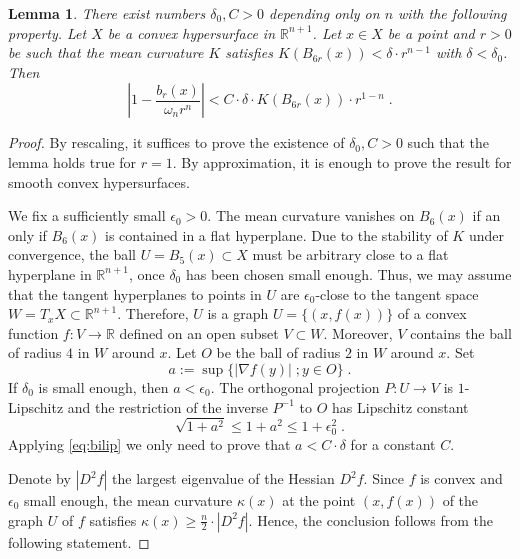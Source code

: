 \documentclass[12pt,leqno]{amsart}
\numberwithin{equation}{section}
\newtheorem{lem}[thm]{Lemma}
\theoremstyle{definition}
\theoremstyle{remark}
\newcommand{\R}{\mathbb{R}}
\begin{document}

\begin{lem}  \label{lem:mean}
There exist numbers $\delta_0,C>0$ depending only on $n$ with the following property. Let $X$ be a convex hypersurface in $\R^{n+1}$.
Let $x\in X$ be a point and $r>0$ be such that the mean curvature $K$ satisfies  $K(B_{6r} (x))  < \delta \cdot r^{n-1}$ with $\delta <\delta _0$.
Then
\begin{equation} \label{eq:lemma}
| 1 -  \frac {b_r (x)} { \omega _n r^n}| < C\cdot \delta \cdot K( B_{6r} (x)) \cdot r^{1-n} \; .
\end{equation}
\end{lem}


\begin{proof}
By rescaling, it suffices to prove the existence of $\delta _0, C>0$ such that the lemma holds true for $r=1$.
By approximation, it is enough to prove the result for smooth convex hypersurfaces.


We fix a sufficiently small $\epsilon _0>0$.   The mean curvature vanishes on $B_6 (x)$ if an only if $B_6(x)$ is contained in a flat hyperplane.
 Due to  the stability of $K$ under convergence,      the ball $U=B_{5} (x) \subset X$ must be  arbitrary close to a flat hyperplane in $\R^{n+1}$,
once $\delta _0$ has been chosen small enough.  Thus, we may assume
 that  the tangent hyperplanes  to points in $U$  are $\epsilon_0$-close to  the tangent
space  $W =T_xX \subset \R^{n+1}$.  Therefore, $U$ is a graph  $U=\{(x,f(x))\}$ of a convex function $f:V\to \R$ defined on an open subset $V\subset W$. Moreover, $V$ contains the ball of radius $4$ in $W$ around $x$. Let $O$
be the ball of radius $2$ in $W$ around $x$. Set
$$a :=\sup \{ |\nabla f (y)| \; ; y\in O \} \; .$$
If $\delta _0$ is small enough, then $a<\epsilon_0$.  The orthogonal projection $P:U\to V$ is $1$-Lipschitz and the restriction of the inverse $P^{-1}$ to $O$  has Lipschitz constant  $$\sqrt {1+ a^2}  \leq 1+a^2 \leq 1+\epsilon_0 ^2 \; .$$
Applying \eqref{eq:bilip} we only need to prove that $a < C \cdot \delta $ for a constant $C$.

Denote by $|D^2f|$ the largest eigenvalue of the Hessian $D^2f$.  Since $f$ is convex and $\epsilon _0$ small enough,  the mean curvature $\mathcal \kappa (x)$ at the point $(x,f(x))$ of the graph $U$ of $f$ satisfies $\kappa (x) \geq \frac n 2  \cdot  |D^2 f|$.  Hence, the conclusion  follows from the following statement.



\end{proof}
\end{document}
